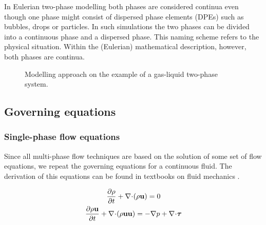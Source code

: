 In Eulerian two-phase modelling both phases are considered continua even though 
one phase might consist of dispersed phase elements (\acp{DPE}) such as bubbles, drops 
or particles. In such simulations the two phases can be divided into a 
continuous phase and a dispersed phase. This naming scheme refers to the physical 
situation. Within the (Eulerian) mathematical description, however, both phases 
are continua.


\begin{figure}[htbp]
  \null\hfill
  \hfill
  \hfill\null
  \caption{Modelling approach on the example of a gas-liquid two-phase system.}
  \label{fig:twoPhaseSim_resolution}
\end{figure}




\subsection{Governing equations}


\subsubsection{Single-phase flow equations}
\label{sec:singlePhaseFlowEquations}

Since all multi-phase flow techniques are based on the solution of some set of flow equations, 
we repeat the governing equations for a continuous fluid. The derivation of this equations can 
be found in textbooks on fluid mechanics \cite{versteegMalalasekera1995,Anderson1995}.

\begin{gather}
	\frac{\partial \rho}{\partial t} + \nabla\kern-.2em\cdot\kern-.2em\left( \rho \mathbf{u} \right) = 0 
		\label{eq:genericSinglePhaseContinuityTmp01} \\
	\frac{\partial \rho  \mathbf{u}}{\partial t}
		+ \nabla\kern-.2em\cdot\kern-.2em\left( \rho \mathbf{u} \mathbf{u} \right)
		= -\nabla p + \nabla\kern-.2em\cdot\kern-.2em\bm{\tau} \label{eq:genericSinglePhaseContinuityTmp02}
\end{gather}


